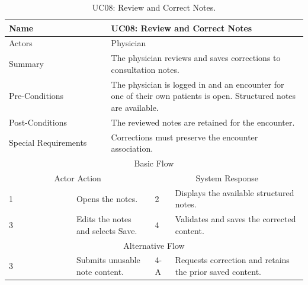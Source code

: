 \begin{table}[htbp]
\centering
\small
\caption{UC08: Review and Correct Notes.}
\label{tab:kashaf:uc08}
\begin{tabular}{|p{}|p{}|p{}|p{}|p{}|}
\hline
\multicolumn{2}{|p{\dimexpr0.225\textwidth+2\tabcolsep+\arrayrulewidth\relax}|}{Name} & \multicolumn{3}{p{\dimexpr0.575\textwidth+4\tabcolsep+2\arrayrulewidth\relax}|}{UC08: Review and Correct Notes} \\ \hline
\multicolumn{2}{|p{\dimexpr0.225\textwidth+2\tabcolsep+\arrayrulewidth\relax}|}{Actors} & \multicolumn{3}{p{\dimexpr0.575\textwidth+4\tabcolsep+2\arrayrulewidth\relax}|}{Physician} \\ \hline
\multicolumn{2}{|p{\dimexpr0.225\textwidth+2\tabcolsep+\arrayrulewidth\relax}|}{Summary} & \multicolumn{3}{p{\dimexpr0.575\textwidth+4\tabcolsep+2\arrayrulewidth\relax}|}{The physician reviews and saves corrections to consultation notes.} \\ \hline
\multicolumn{2}{|p{\dimexpr0.225\textwidth+2\tabcolsep+\arrayrulewidth\relax}|}{Pre-Conditions} & \multicolumn{3}{p{\dimexpr0.575\textwidth+4\tabcolsep+2\arrayrulewidth\relax}|}{The physician is logged in and an encounter for one of their own patients is open. Structured notes are available.} \\ \hline
\multicolumn{2}{|p{\dimexpr0.225\textwidth+2\tabcolsep+\arrayrulewidth\relax}|}{Post-Conditions} & \multicolumn{3}{p{\dimexpr0.575\textwidth+4\tabcolsep+2\arrayrulewidth\relax}|}{The reviewed notes are retained for the encounter.} \\ \hline
\multicolumn{2}{|p{\dimexpr0.225\textwidth+2\tabcolsep+\arrayrulewidth\relax}|}{Special Requirements} & \multicolumn{3}{p{\dimexpr0.575\textwidth+4\tabcolsep+2\arrayrulewidth\relax}|}{Corrections must preserve the encounter association.} \\ \hline
\multicolumn{5}{|c|}{Basic Flow} \\ \hline
\multicolumn{3}{|c|}{Actor Action} & \multicolumn{2}{c|}{System Response} \\ \hline
1 & \multicolumn{2}{p{\dimexpr0.37\textwidth+2\tabcolsep+\arrayrulewidth\relax}|}{Opens the notes.} & 2 & Displays the available structured notes. \\ \hline
3 & \multicolumn{2}{p{\dimexpr0.37\textwidth+2\tabcolsep+\arrayrulewidth\relax}|}{Edits the notes and selects Save.} & 4 & Validates and saves the corrected content. \\ \hline
\multicolumn{5}{|c|}{Alternative Flow} \\ \hline
3 & \multicolumn{2}{p{\dimexpr0.37\textwidth+2\tabcolsep+\arrayrulewidth\relax}|}{Submits unusable note content.} & 4-A & Requests correction and retains the prior saved content. \\ \hline
\end{tabular}
\end{table}

